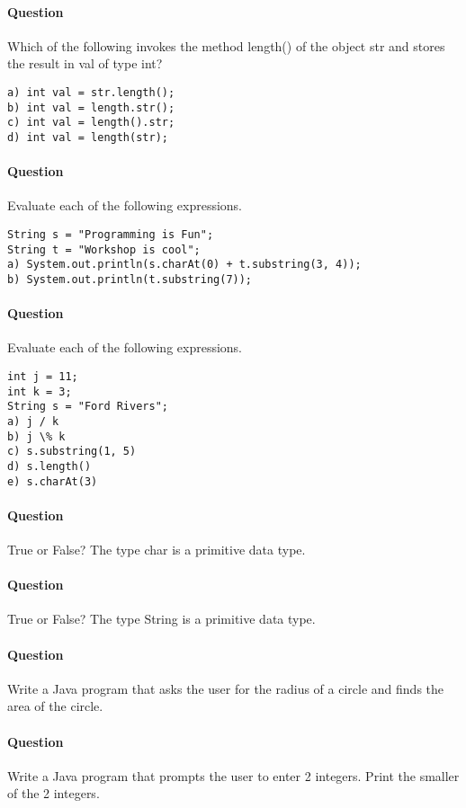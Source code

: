 \documentclass{article}
\begin{document}
\addtocounter{question_num}{1}
\paragraph{Question }
Which of the following invokes the method length() of the object str and stores the result in val of type int?
\begin{lstlisting}
a) int val = str.length();
b) int val = length.str();
c) int val = length().str;
d) int val = length(str);
\end{lstlisting}

\addtocounter{question_num}{1}
\paragraph{Question }
Evaluate each of the following expressions.
\begin{lstlisting}
String s = "Programming is Fun";
String t = "Workshop is cool";
a) System.out.println(s.charAt(0) + t.substring(3, 4));
b) System.out.println(t.substring(7));
\end{lstlisting}

\addtocounter{question_num}{1}
\paragraph{Question }
Evaluate each of the following expressions.
\begin{lstlisting}
int j = 11;
int k = 3;
String s = "Ford Rivers";
a) j / k
b) j \% k
c) s.substring(1, 5)
d) s.length()
e) s.charAt(3)
\end{lstlisting}

\addtocounter{question_num}{1}
\paragraph{Question }
True or False? The type char is a primitive data type.

\addtocounter{question_num}{1}
\paragraph{Question }
True or False? The type String is a primitive data type.

\addtocounter{question_num}{1}
\paragraph{Question }
Write a Java program that asks the user for the radius of a circle and finds the area of the circle.

\addtocounter{question_num}{1}
\paragraph{Question }
Write a Java program that prompts the user to enter 2 integers. Print the smaller of the 2 integers.
\end{document}

